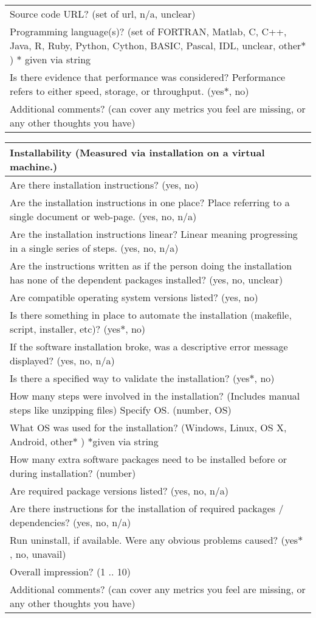 \begin{table}[H]
\begin{tabular}{p{14cm}}
Source code URL? ({set of url, n/a, unclear})\\
Programming language(s)? (set of {FORTRAN, Matlab, C, C++, Java, R, Ruby, Python, Cython, BASIC, Pascal, IDL, unclear, other$\ast$}) $\ast$ given via string \\
Is there evidence that performance was considered? Performance refers to either speed, storage, or throughput. ({yes$\ast$, no})\\
Additional comments? (can cover any metrics you feel are missing, or any other thoughts you have) \\
\hline
\end{tabular}
\end{table}

\begin{table}[H]
\centering
\begin{tabular}{p{14cm}}
\hline
\textbf{Installability  (Measured via installation on a virtual machine.) }\\
\hline
Are there installation instructions? ({yes, no})\\
Are the installation instructions in one place? Place referring to a single document or web-page. ({yes, no, n/a})\\
Are the installation instructions linear? Linear meaning progressing  in a single series of steps. ({yes, no, n/a})\\
Are the instructions written as if the person doing the installation has none of the dependent packages installed? ({yes, no, unclear})\\
Are compatible operating system versions listed? ({yes, no})\\
Is there something in place to automate the installation (makefile, script, installer, etc)? ({yes$\ast$, no})\\
If the software installation broke, was a descriptive error message displayed? ({yes, no, n/a})\\
Is there a specified way to validate the installation? ({yes$\ast$, no})\\
How many steps were involved in the installation? (Includes manual steps like unzipping files) Specify OS. (number, OS)\\
What OS was used for the installation? ({Windows, Linux, OS X, Android, other$\ast$ }) $\ast$given via string\\
How many extra software packages need to be installed before or during installation? (number)\\
Are required package versions listed? ({yes, no, n/a})\\
Are there instructions for the installation of required packages / dependencies? ({yes, no, n/a})\\
Run uninstall, if available. Were any obvious problems caused? ({yes$\ast$ , no, unavail})\\
Overall impression? ({1 .. 10})\\
Additional comments? (can cover any metrics you feel are missing, or any other thoughts you have)\\
\hline
\end{tabular}
\end{table}

